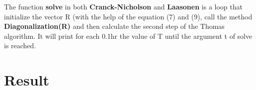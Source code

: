 \documentclass [10 pt, a4 paper]{article}
\begin{document}
The function \textbf{solve} in both \textbf{Cranck-Nicholson} and \textbf{Laasonen} 
is a loop that initialize the vector R (with the help of the equation (7) and (9),
call the method \textbf{Diagonalization(R)} and then calculate the second step of the
Thomas algorithm. It will print for each 0.1hr the value of T until the argument t of
solve is reached.
\quad

\section{Result}
\end{document}
